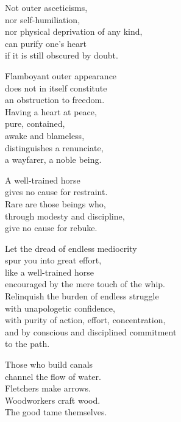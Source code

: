 Not outer asceticisms,\\
nor self-humiliation,\\
nor physical deprivation of any kind,\\
can purify one’s heart\\
if it is still obscured by doubt.


Flamboyant outer appearance\\
does not in itself constitute\\
an obstruction to freedom.\\
Having a heart at peace,\\
pure, contained,\\
awake and blameless,\\
distinguishes a renunciate,\\
a wayfarer, a noble being.


A well-trained horse\\
gives no cause for restraint.\\
Rare are those beings who,\\
through modesty and discipline,\\
give no cause for rebuke.


Let the dread of endless mediocrity\\
spur you into great effort,\\
like a well-trained horse\\
encouraged by the mere touch of the whip.\\
Relinquish the burden of endless struggle\\
with unapologetic confidence,\\
with purity of action, effort, concentration,\\
and by conscious and disciplined commitment\\
to the path.


Those who build canals\\
channel the flow of water.\\
Fletchers make arrows.\\
Woodworkers craft wood.\\
The good tame themselves.

